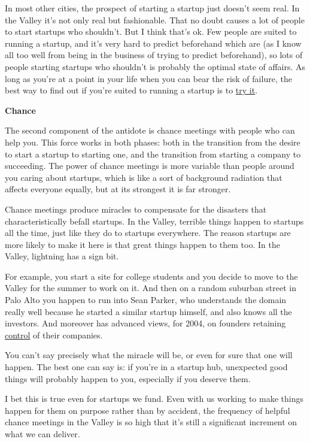 In most other cities, the prospect of starting a startup just doesn't
seem real. In the Valley it's not only real but fashionable. That no
doubt causes a lot of people to start startups who shouldn't. But I
think that's ok. Few people are suited to running a startup, and it's
very hard to predict beforehand which are (as I know all too well from
being in the business of trying to predict beforehand), so lots of
people starting startups who shouldn't is probably the optimal state of
affairs. As long as you're at a point in your life when you can bear the
risk of failure, the best way to find out if you're suited to running a
startup is to \href{notnot.html}{try it}.

\textbf{Chance}

The second component of the antidote is chance meetings with people who
can help you. This force works in both phases: both in the transition
from the desire to start a startup to starting one, and the transition
from starting a company to succeeding. The power of chance meetings is
more variable than people around you caring about startups, which is
like a sort of background radiation that affects everyone equally, but
at its strongest it is far stronger.

Chance meetings produce miracles to compensate for the disasters that
characteristically befall startups. In the Valley, terrible things
happen to startups all the time, just like they do to startups
everywhere. The reason startups are more likely to make it here is that
great things happen to them too. In the Valley, lightning has a sign
bit.

For example, you start a site for college students and you decide to
move to the Valley for the summer to work on it. And then on a random
suburban street in Palo Alto you happen to run into Sean Parker, who
understands the domain really well because he started a similar startup
himself, and also knows all the investors. And moreover has advanced
views, for 2004, on founders retaining \href{control.html}{control} of
their companies.

You can't say precisely what the miracle will be, or even for sure that
one will happen. The best one can say is: if you're in a startup hub,
unexpected good things will probably happen to you, especially if you
deserve them.

I bet this is true even for startups we fund. Even with us working to
make things happen for them on purpose rather than by accident, the
frequency of helpful chance meetings in the Valley is so high that it's
still a significant increment on what we can deliver.

